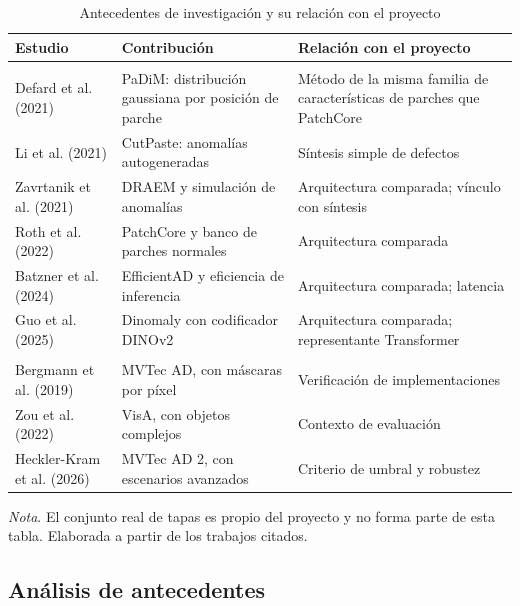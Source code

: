 \documentclass[12pt,oneside]{report}
\newcommand{\nota}[1]{\par\noindent\textit{Nota}. #1\par}
\begin{document}
\begin{table}[H]
\singlespacing\setlength{\parindent}{0pt}\setlength{\RaggedRightParindent}{0pt}
\caption{Antecedentes de investigación y su relación con el proyecto}
\label{tab:antecedentes}
\begin{tabularx}{\textwidth}{@{}>{\RaggedRight\arraybackslash}p{3.7cm}>{\RaggedRight\arraybackslash}X>{\RaggedRight\arraybackslash}X@{}}
\toprule
Estudio & Contribución & Relación con el proyecto \\
\midrule
\multicolumn{3}{@{}l}{\textit{Métodos}} \\
Defard et al. (2021) \cite{defard2021} & PaDiM: distribución gaussiana por posición de parche & Método de la misma familia de características de parches que PatchCore \\
Li et al. (2021) \cite{li2021} & CutPaste: anomalías autogeneradas & Síntesis simple de defectos \\
Zavrtanik et al. (2021) \cite{zavrtanik2021} & DRAEM y simulación de anomalías & Arquitectura comparada; vínculo con síntesis \\
Roth et al. (2022) \cite{roth2022} & PatchCore y banco de parches normales & Arquitectura comparada \\
Batzner et al. (2024) \cite{batzner2024} & EfficientAD y eficiencia de inferencia & Arquitectura comparada; latencia \\
Guo et al. (2025) \cite{guo2025} & Dinomaly con codificador DINOv2 & Arquitectura comparada; representante Transformer \\
\midrule
\multicolumn{3}{@{}l}{\textit{Conjuntos de referencia públicos}} \\
Bergmann et al. (2019) \cite{bergmann2019} & MVTec AD, con máscaras por píxel & Verificación de implementaciones \\
Zou et al. (2022) \cite{zou2022} & VisA, con objetos complejos & Contexto de evaluación \\
Heckler-Kram et al. (2026) \cite{heckler2026} & MVTec AD 2, con escenarios avanzados & Criterio de umbral y robustez \\
\bottomrule
\end{tabularx}
\nota{El conjunto real de tapas es propio del proyecto y no forma parte de esta tabla. Elaborada a partir de los trabajos citados.}
\end{table}

\subsection{Análisis de antecedentes}
\end{document}

